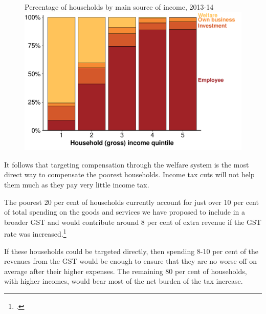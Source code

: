 \begin{figure}[!t]
%
{Percentage of households by main source of income, 2013-14}
\includegraphics[width=\columnwidth]{atlas/figure/GST-Figure-5-1.pdf}

\end{figure}

It follows that targeting compensation through the welfare system is the most direct way to compensate the poorest households. Income tax cuts will not help them much as they pay very little income tax. 

The poorest 20 per cent of households currently account for just over 10 per cent of total spending on the goods and services we have proposed to include in a broader GST and would contribute around 8 per cent of extra revenue if the GST rate was increased.\footcite{ABS2015HouseholdIncomeWealth1314}

If these households could be targeted directly, then spending 8-10 per cent of the revenues from the GST would be enough to ensure that they are no worse off on average after their higher expenses. The remaining 80 per cent of households, with higher incomes, would bear most of the net burden of the tax increase.



